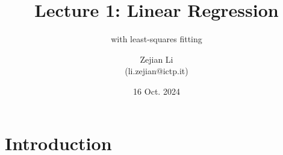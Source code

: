\documentclass[10pt,aspectratio=169,handout]{beamer}
\begin{document}
\author{Zejian Li \\(li.zejian@ictp.it)}
\title{Lecture 1: Linear Regression}
\subtitle{with least-squares fitting}
\date{16 Oct. 2024}


\begin{frame}[plain]
	\maketitle
\end{frame}


\section{Introduction}
\end{document}
